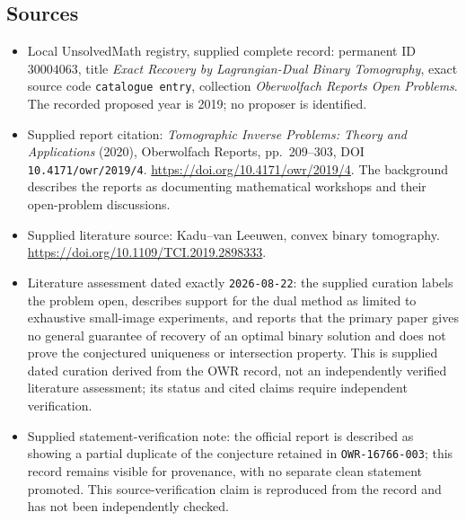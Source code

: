 \documentclass[11pt]{article}
\begin{document}
\subsection{Sources}
\begin{itemize}
\item Local UnsolvedMath registry, supplied complete record: permanent ID \(30004063\), title \emph{Exact Recovery by Lagrangian-Dual Binary Tomography}, exact source code \texttt{catalogue entry}, collection \emph{Oberwolfach Reports Open Problems}. The recorded proposed year is 2019; no proposer is identified.
\item Supplied report citation: \emph{Tomographic Inverse Problems: Theory and Applications} (2020), Oberwolfach Reports, pp.~209--303, DOI \texttt{10.4171/owr/2019/4}. \url{https://doi.org/10.4171/owr/2019/4}. The background describes the reports as documenting mathematical workshops and their open-problem discussions.
\item Supplied literature source: Kadu--van Leeuwen, convex binary tomography. \url{https://doi.org/10.1109/TCI.2019.2898333}.
\item Literature assessment dated exactly \texttt{2026-08-22}: the supplied curation labels the problem open, describes support for the dual method as limited to exhaustive small-image experiments, and reports that the primary paper gives no general guarantee of recovery of an optimal binary solution and does not prove the conjectured uniqueness or intersection property. This is supplied dated curation derived from the OWR record, not an independently verified literature assessment; its status and cited claims require independent verification.
\item Supplied statement-verification note: the official report is described as showing a partial duplicate of the conjecture retained in \texttt{OWR-16766-003}; this record remains visible for provenance, with no separate clean statement promoted. This source-verification claim is reproduced from the record and has not been independently checked.
\end{itemize}
\end{document}
